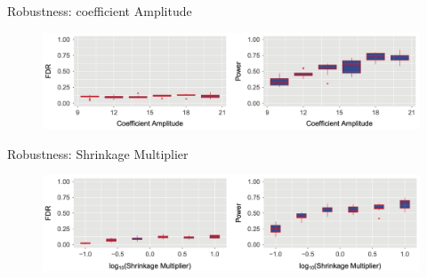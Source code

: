 \begin{frame}{Robustness: coefficient Amplitude}
    \begin{figure}\label{fig:robust2}
        \centering
        \includegraphics[width = 0.95 \textwidth]{images/robust2.png}
    \end{figure}
\end{frame}

\begin{frame}{Robustness: Shrinkage Multiplier}
    \begin{figure}\label{fig:robust3}
        \centering
        \includegraphics[width = 0.95 \textwidth]{images/robust3.png}
    \end{figure}
\end{frame}